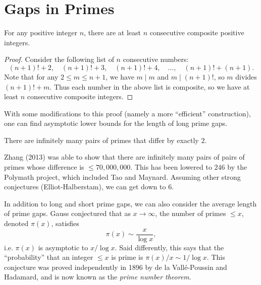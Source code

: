 \section{Gaps in Primes}
\begin{prop}
  For any positive integer $n$, there are
  at least $n$ consecutive composite
  positive integers.
\end{prop}

\begin{proof}
  Consider the following list of $n$
  consecutive numbers:
  \[
    (n + 1)! + 2,\quad (n + 1)! + 3,\quad
    (n + 1)! + 4,\quad
    \dots,\quad (n + 1)! + (n + 1).
  \]
  Note that for any $2 \le m \le n + 1$,
  we have $m \mid m$ and $m \mid (n + 1)!$,
  so $m$ divides $(n + 1)! + m$.
  Thus each number in the above list
  is composite, so we have at least
  $n$ consecutive composite integers.
\end{proof}

\begin{remark}
  With some modifications to this proof
  (namely a more ``efficient''
  construction), one can find asymptotic
  lower bounds for the length of long
  prime gaps.
\end{remark}

\begin{conjecture}
  There are infinitely many pairs
  of primes that differ by exactly $2$.
\end{conjecture}

\begin{remark}
  Zhang (2013) was able to show that
  there are infinitely many pairs of
  pairs of primes whose difference is
  $\le 70,000,000$. This has been
  lowered to $246$ by the Polymath project,
  which included Tao and Maynard. Assuming
  other strong conjectures
  (Elliot-Halberstam), we can get
  down to $6$.
\end{remark}

\begin{remark}
  In addition to long and short prime gaps,
  we can also consider the average length
  of prime gaps. Gauss conjectured that
  as $x \to \infty$, the number of primes
  $\le x$, denoted $\pi(x)$, satisfies
  \[
    \pi(x) \sim \frac{x}{\log x},
  \]
  i.e. $\pi(x)$ is asymptotic
  to $x / {\log x}$. Said
  differently, this says that the
  ``probability'' that an integer $\le x$
  is prime is $\pi(x) / x \sim 1 / {\log x}$.
  This conjecture was proved independently
  in 1896 by de la Vall\'e-Poussin and
  Hadamard, and is now known as the
  \emph{prime number theorem}.
\end{remark}

